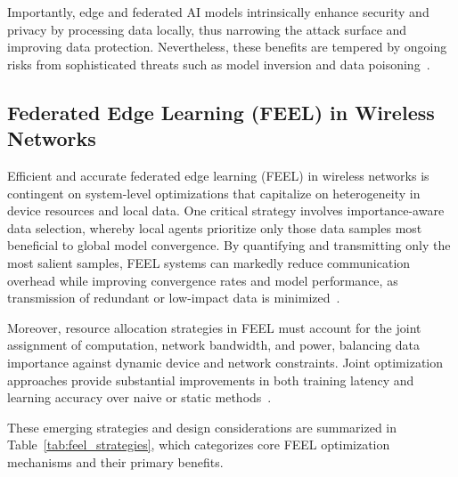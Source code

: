 \documentclass[sigconf]{acmart}
\begin{document}
Importantly, edge and federated AI models intrinsically enhance security and privacy by processing data locally, thus narrowing the attack surface and improving data protection. Nevertheless, these benefits are tempered by ongoing risks from sophisticated threats such as model inversion and data poisoning~\cite{ref17,ref19,ref23,ref24}.

\subsection{Federated Edge Learning (FEEL) in Wireless Networks}

Efficient and accurate federated edge learning (FEEL) in wireless networks is contingent on system-level optimizations that capitalize on heterogeneity in device resources and local data. One critical strategy involves importance-aware data selection, whereby local agents prioritize only those data samples most beneficial to global model convergence. By quantifying and transmitting only the most salient samples, FEEL systems can markedly reduce communication overhead while improving convergence rates and model performance, as transmission of redundant or low-impact data is minimized~\cite{ref42}. 

Moreover, resource allocation strategies in FEEL must account for the joint assignment of computation, network bandwidth, and power, balancing data importance against dynamic device and network constraints. Joint optimization approaches provide substantial improvements in both training latency and learning accuracy over naive or static methods~\cite{ref42}. 

These emerging strategies and design considerations are summarized in Table~\ref{tab:feel_strategies}, which categorizes core FEEL optimization mechanisms and their primary benefits.
\end{document}
